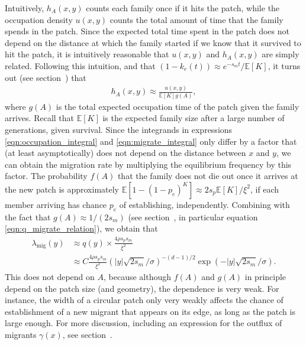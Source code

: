 \documentclass{article}
\newcommand{\E}{\mathbb{E}}
\newcommand{\migrate}{\lambda_\text{mig}}
\begin{document}
Intuitively, $h_A(x,y)$ counts each family once if it hits the patch,
while the occupation density $u(x,y)$ counts the total amount of time that the family spends in the patch.
Since the expected total time spent in the patch does not depend on the distance at which the family started
if we know that it survived to hit the patch,
it is intuitively reasonable that $u(x,y)$ and $h_A(x,y)$ are simply related.
Following this intuition,
and that $(1-k_e(t)) \approx e^{-s_m t}/\E[K]$,
it turns out (see section~) that
\begin{align} 
    h_A(x,y) \approx \frac{ u(x,y) }{ \E[K] g(A) } ,
\end{align}
where $g(A)$ is the total expected occupation time of the patch given the family arrives.
Recall that $\E[K]$ is the expected family size after a large number of generations, given survival.
Since the integrands in expressions \ref{eqn:occupation_integral} and \ref{eqn:migrate_integral} only differ by a factor
that (at least asymptotically) does not depend on the distance between $x$ and $y$,
we can obtain the migration rate by multiplying the equilibrium frequency by this factor.
The probability $f(A)$ that the family does not die out once it arrives at the new patch is
approximately $\E[1-(1-p_e)^K] \approx 2 s_p \E[K] / \xi^2$,
if each member arriving has chance $p_e$ of establishing, independently.
Combining with the fact that $g(A)\approx 1/(2s_m)$ (see section~, in particular equation \eqref{eqn:q_migrate_relation}),
we obtain that
\begin{align}
  \label{eqn:migrate} 
  \migrate(y) &\approx q(y) \times \frac{ 4 \rho s_p  s_m }{ \xi^2 }  \\
  &\approx C \frac{ 4 \rho s_p s_m }{ \xi^2 } \left( |y| \sqrt{2 s_m}/\sigma \right)^{-(d-1)/2} \exp( - |y| \sqrt{2 s_m} / \sigma) .
\end{align}
This does not depend on $A$, because although
$f(A)$ and $g(A)$ in principle depend on the patch size (and geometry),
the dependence is very weak.
For instance, the width of a circular patch only very weakly affects the chance 
of establishment of a new migrant that appears on its edge,
as long as the patch is large enough.
For more discussion, including an expression for the outflux of migrants $\gamma(x)$, see section~.
\end{document}
